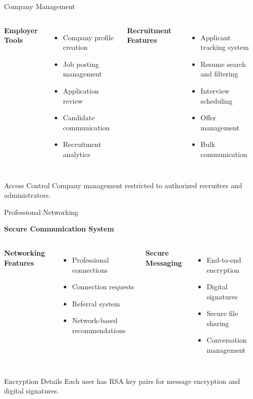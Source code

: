 \documentclass[aspectratio=169]{beamer}
\begin{document}
\begin{frame}{Company Management}
\begin{columns}
\textbf{Employer Tools}
\begin{itemize}
    \item Company profile creation
    \item Job posting management
    \item Application review
    \item Candidate communication
    \item Recruitment analytics
\end{itemize}

\textbf{Recruitment Features}
\begin{itemize}
    \item Applicant tracking system
    \item Resume search and filtering
    \item Interview scheduling
    \item Offer management
    \item Bulk communication
\end{itemize}
\end{columns}

\vspace{0.3cm}
\begin{exampleblock}{Access Control}
Company management restricted to authorized recruiters and administrators.
\end{exampleblock}
\end{frame}

\begin{frame}{Professional Networking}
\begin{center}
\textbf{Secure Communication System}
\end{center}

\begin{columns}
\textbf{Networking Features}
\begin{itemize}
    \item Professional connections
    \item Connection requests
    \item Referral system
    \item Network-based recommendations
\end{itemize}

\textbf{Secure Messaging}
\begin{itemize}
    \item End-to-end encryption
    \item Digital signatures
    \item Secure file sharing
    \item Conversation management
\end{itemize}
\end{columns}

\vspace{0.3cm}
\begin{exampleblock}{Encryption Details}
Each user has RSA key pairs for message encryption and digital signatures.
\end{exampleblock}
\end{frame}
\end{document}
